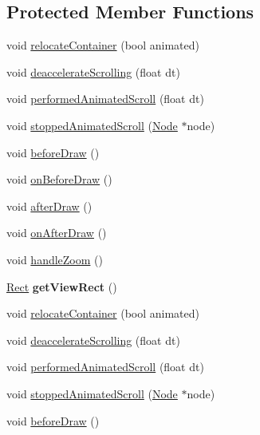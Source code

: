 \subsection*{Protected Member Functions}
\begin{DoxyCompactItemize}
\item 
void \hyperlink{classScrollView_a2c4fd75c5fd7f66cfaec50553d2efa69}{relocate\+Container} (bool animated)
\item 
void \hyperlink{classScrollView_ad3519eeb9b3afad87767e722b54427f0}{deaccelerate\+Scrolling} (float dt)
\item 
void \hyperlink{classScrollView_ac3f32e65ea62a4322c37da1316ebc110}{performed\+Animated\+Scroll} (float dt)
\item 
void \hyperlink{classScrollView_a63f5487af2b0ff9b8a58dcb3921c9026}{stopped\+Animated\+Scroll} (\hyperlink{classNode}{Node} $\ast$node)
\item 
void \hyperlink{classScrollView_a4576d3e279850eb6f31c1fa48aeb8d6e}{before\+Draw} ()
\item 
void \hyperlink{classScrollView_acffe0b2442bc6ef4d9f3885c536e6c44}{on\+Before\+Draw} ()
\item 
void \hyperlink{classScrollView_a1dbdfe5db3d1d1dbfe2099c2167818e3}{after\+Draw} ()
\item 
void \hyperlink{classScrollView_a5c8a81ace51864941969d9fc1e4cc505}{on\+After\+Draw} ()
\item 
void \hyperlink{classScrollView_a9eedb1e4515a77abc80fcfacb4638474}{handle\+Zoom} ()
\item 
\mbox{\label{classScrollView_a1a64fa99456d234f42950aae4b3d92cb}} 
\hyperlink{classRect}{Rect} {\bfseries get\+View\+Rect} ()
\item 
void \hyperlink{classScrollView_a2c4fd75c5fd7f66cfaec50553d2efa69}{relocate\+Container} (bool animated)
\item 
void \hyperlink{classScrollView_ad3519eeb9b3afad87767e722b54427f0}{deaccelerate\+Scrolling} (float dt)
\item 
void \hyperlink{classScrollView_ac3f32e65ea62a4322c37da1316ebc110}{performed\+Animated\+Scroll} (float dt)
\item 
void \hyperlink{classScrollView_a63f5487af2b0ff9b8a58dcb3921c9026}{stopped\+Animated\+Scroll} (\hyperlink{classNode}{Node} $\ast$node)
\item 
void \hyperlink{classScrollView_a4576d3e279850eb6f31c1fa48aeb8d6e}{before\+Draw} ()
\item 

\end{DoxyCompactItemize}
